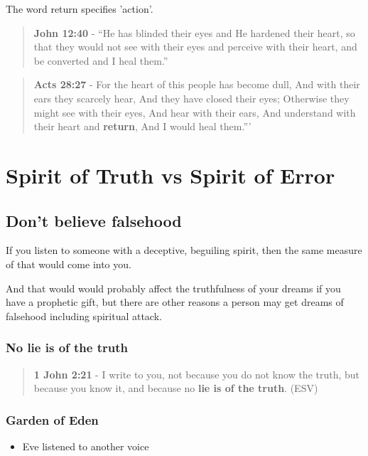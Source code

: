 \documentclass[11pt]{article}
\begin{document}
The word return specifies 'action'.

\begin{quote}
\textbf{John 12:40} - “He has blinded their eyes and He hardened their heart, so that they would not see with their eyes and perceive with their heart, and be converted and I heal them.”
\end{quote}

\begin{quote}
\textbf{Acts 28:27} - For the heart of this people has become dull, And with their ears they scarcely hear, And they have closed their eyes; Otherwise they might see with their eyes, And hear with their ears, And understand with their heart and \textbf{return}, And I would heal them.”’
\end{quote}

\section{Spirit of Truth vs Spirit of Error}
\label{sec:orgc29d889}
\subsection{Don't believe falsehood}
\label{sec:orge7557ac}
If you listen to someone with a deceptive, beguiling spirit, then the same measure of that would come into you.

And that would would probably affect the truthfulness of your dreams if you have a prophetic gift, but there are other reasons a person may get dreams of falsehood including spiritual attack.

\subsubsection{No lie is of the truth}
\label{sec:org9d8e2b2}
\begin{quote}
\textbf{1 John 2:21} -  I write to you, not because you do not know the truth, but because you know it, and because no \textbf{lie is of the truth}.  (ESV)
\end{quote}

\subsubsection{Garden of Eden}
\label{sec:org39ef365}
\begin{itemize}
\item Eve listened to another voice
\end{itemize}
\end{document}
